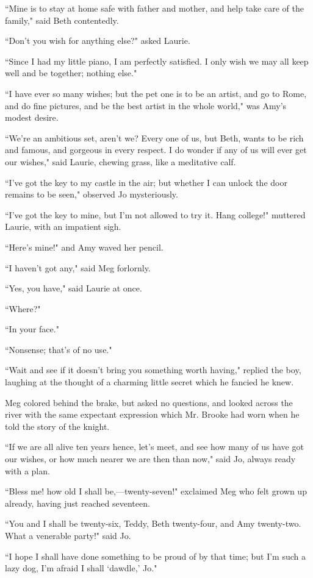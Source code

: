 ``Mine is to stay at home safe with father and mother, and help take care
of the family," said Beth contentedly.

``Don't you wish for anything else?" asked Laurie.

``Since I had my little piano, I am perfectly satisfied. I only wish we
may all keep well and be together; nothing else."

``I have ever so many wishes; but the pet one is to be an artist, and go
to Rome, and do fine pictures, and be the best artist in the whole
world," was Amy's modest desire.

``We're an ambitious set, aren't we?
Every one of us, but Beth, wants to be rich and famous, and gorgeous in
every respect. I do wonder if any of us will ever get our wishes," said
Laurie, chewing grass, like a meditative calf.

``I've got the key to my castle in the air; but whether I
can unlock the door remains to be seen," observed Jo mysteriously.

``I've got the key to mine, but I'm not
allowed to try it. Hang college!" muttered Laurie, with an impatient
sigh.

``Here's mine!" and Amy waved her pencil.

``I haven't got any," said Meg forlornly.

``Yes, you have," said Laurie at once.

``Where?"

``In your face."

``Nonsense; that's of no use."

``Wait and see if it doesn't bring you something worth
having," replied the boy, laughing at the thought of a charming little
secret which he fancied he knew.

Meg colored behind the brake, but asked no questions, and looked across
the river with the same expectant expression which Mr. Brooke had worn
when he told the story of the knight.

``If we are all alive ten years hence, let's meet, and
see how many of us have got our wishes, or how much nearer we are then
than now," said Jo, always ready with a plan.

``Bless me! how old I shall be,---twenty-seven!" exclaimed Meg who felt
grown up already, having just reached seventeen.

``You and I shall be twenty-six, Teddy, Beth twenty-four, and Amy
twenty-two. What a venerable party!" said Jo.

``I hope I shall have done something to be proud of by that time; but
I'm such a lazy dog, I'm afraid I shall
`dawdle,' Jo."

